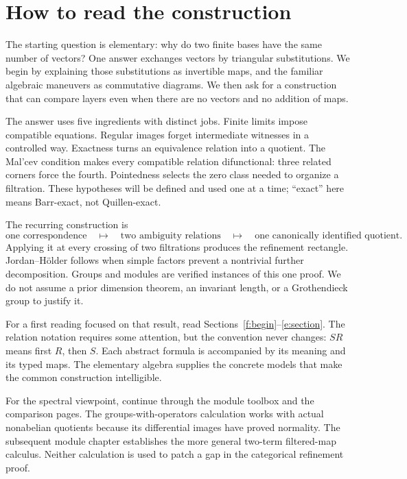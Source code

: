 \section*{How to read the construction}

The starting question is elementary: why do two finite bases have the same
number of vectors? One answer exchanges vectors by triangular substitutions.
We begin by explaining those substitutions as invertible maps, and the
familiar algebraic maneuvers as commutative diagrams. We then ask for a
construction that can compare layers even when there are no vectors and
no addition of maps.

The answer uses five ingredients with distinct jobs. Finite limits impose
compatible equations. Regular images forget intermediate witnesses in a
controlled way. Exactness turns an equivalence relation into a quotient.
The Mal'cev condition makes every compatible relation difunctional:
three related corners force the fourth. Pointedness selects the zero class
needed to organize a filtration. These hypotheses will be defined and used
one at a time; ``exact'' here means Barr-exact, not Quillen-exact.

The recurring construction is
\[
 \text{one correspondence}
 \quad\longmapsto\quad
 \text{two ambiguity relations}
 \quad\longmapsto\quad
 \text{one canonically identified quotient}.
\]
Applying it at every crossing of two filtrations produces the refinement
rectangle. Jordan--H\"older follows when simple factors prevent a
nontrivial further decomposition. Groups and modules are verified
instances of this one proof. We do not assume a prior dimension theorem,
an invariant length, or a Grothendieck group to justify it.

For a first reading focused on that result, read
Sections~\ref{f:begin}--\ref{e:section}. The relation notation requires
some attention, but the convention never changes: $SR$ means first $R$,
then $S$. Each abstract formula is accompanied by its meaning and its
typed maps. The elementary algebra supplies the concrete models that make
the common construction intelligible.

For the spectral viewpoint, continue through the module toolbox and the
comparison pages. The groups-with-operators calculation works with actual
nonabelian quotients because its differential images have proved
normality. The subsequent module chapter establishes the more general
two-term filtered-map calculus. Neither calculation is used to patch a
gap in the categorical refinement proof.

